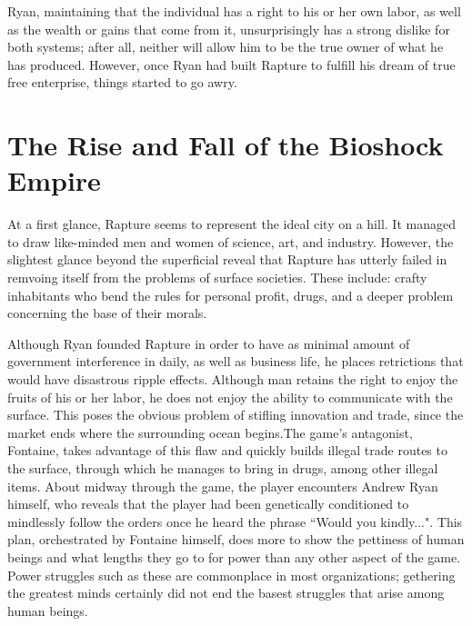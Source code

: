 \documentclass{article}
\begin{document}
Ryan, maintaining that the individual has a right to his or her own labor, as well as the wealth or gains that 
come from it, unsurprisingly has a strong dislike for both systems; after all, neither will allow him to 
be the true owner of what he has produced. However, once Ryan had built Rapture to fulfill his dream of 
true free enterprise, things started to go awry. 

\section{The Rise and Fall of the Bioshock Empire}
At a first glance, Rapture seems to represent the ideal city on a hill. It managed to draw like-minded men and
women of science, art, and industry. However, the slightest glance beyond the superficial reveal that Rapture
has utterly failed in remvoing itself from the problems of surface societies. These include: crafty inhabitants
who bend the rules for personal profit, drugs, and a deeper problem concerning the base of their morals. 

Although Ryan founded Rapture in order to have as minimal amount of government interference in daily, as well 
as business life, he places retrictions that would have disastrous ripple effects.  Although man retains
the right to enjoy the fruits of his or her labor, he does not enjoy the ability to communicate with the 
surface. This poses the obvious problem of stifling innovation and trade, since the market ends where the 
surrounding ocean begins.The game's antagonist, Fontaine, takes advantage of this flaw and quickly builds 
illegal trade routes to the
surface, through which he manages to bring in drugs, among other illegal items. About midway through the game,
the player encounters  Andrew Ryan himself, who reveals that the player had been genetically conditioned to
mindlessly follow the orders once he heard the phrase ``Would you kindly...". This plan, orchestrated by 
Fontaine himself, does more to show the pettiness of human beings and what lengths they go to for power than 
any other aspect of the game. Power struggles such as these are commonplace in most organizations; 
gethering the greatest minds certainly did not end the basest struggles that arise among human beings. 
\end{document}
